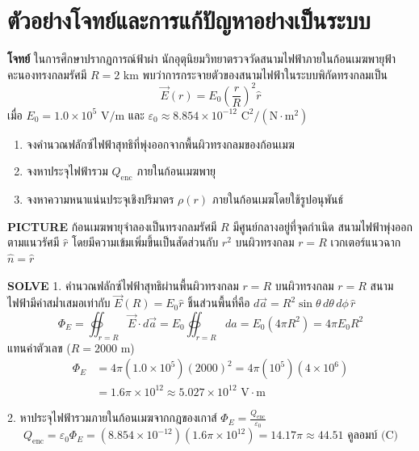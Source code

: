 \section{ตัวอย่างโจทย์และการแก้ปัญหาอย่างเป็นระบบ}

\begin{mathexample}
\textbf{โจทย์} ในการศึกษาปรากฏการณ์ฟ้าผ่า นักอุตุนิยมวิทยาตรวจวัดสนามไฟฟ้าภายในก้อนเมฆพายุฟ้าคะนองทรงกลมรัศมี $R = 2\text{ km}$ พบว่าการกระจายตัวของสนามไฟฟ้าในระบบพิกัดทรงกลมเป็น
\begin{equation}
\vec{E}(r) = E_0 \left(\frac{r}{R}\right)^2 \hat{r}
\end{equation}
เมื่อ $E_0 = 1.0 \times 10^5\text{ V/m}$ และ $\varepsilon_0 \approx 8.854 \times 10^{-12}\text{ C}^2/(\text{N}\cdot\text{m}^2)$
\begin{enumerate}
    \item จงคำนวณฟลักซ์ไฟฟ้าสุทธิที่พุ่งออกจากพื้นผิวทรงกลมของก้อนเมฆ
    \item จงหาประจุไฟฟ้ารวม $Q_{\text{enc}}$ ภายในก้อนเมฆพายุ
    \item จงหาความหนาแน่นประจุเชิงปริมาตร $\rho(r)$ ภายในก้อนเมฆโดยใช้รูปอนุพันธ์
\end{enumerate}

\vspace{0.2cm}
\textbf{PICTURE} ก้อนเมฆพายุจำลองเป็นทรงกลมรัศมี $R$ มีศูนย์กลางอยู่ที่จุดกำเนิด สนามไฟฟ้าพุ่งออกตามแนวรัศมี $\hat{r}$ โดยมีความเข้มเพิ่มขึ้นเป็นสัดส่วนกับ $r^2$ บนผิวทรงกลม $r=R$ เวกเตอร์แนวฉาก $\hat{n} = \hat{r}$

\vspace{0.2cm}
\textbf{SOLVE}
1. คำนวณฟลักซ์ไฟฟ้าสุทธิผ่านพื้นผิวทรงกลม $r = R$
บนผิวทรงกลม $r = R$ สนามไฟฟ้ามีค่าสม่ำเสมอเท่ากับ $\vec{E}(R) = E_0\hat{r}$ ชิ้นส่วนพื้นที่คือ $d\vec{a} = R^2\sin\theta\,d\theta\,d\phi\,\hat{r}$
\begin{equation}
\Phi_E = \oiint_{r=R} \vec{E} \cdot d\vec{a} = E_0 \oiint_{r=R} da = E_0 (4\pi R^2) = 4\pi E_0 R^2
\end{equation}
แทนค่าตัวเลข ($R = 2000\text{ m}$)
\begin{align}
\Phi_E &= 4\pi (1.0 \times 10^5)(2000)^2 = 4\pi (10^5)(4 \times 10^6) \nonumber\\
&= 1.6\pi \times 10^{12} \approx 5.027 \times 10^{12}\text{ V}\cdot\text{m}
\end{align}

2. หาประจุไฟฟ้ารวมภายในก้อนเมฆจากกฎของเกาส์ $\Phi_E = \frac{Q_{\text{enc}}}{\varepsilon_0}$
\begin{equation}
Q_{\text{enc}} = \varepsilon_0 \Phi_E = (8.854 \times 10^{-12})(1.6\pi \times 10^{12}) = 14.17\pi \approx 44.51\text{ คูลอมบ์ (C)}
\end{equation}


\end{mathexample}

